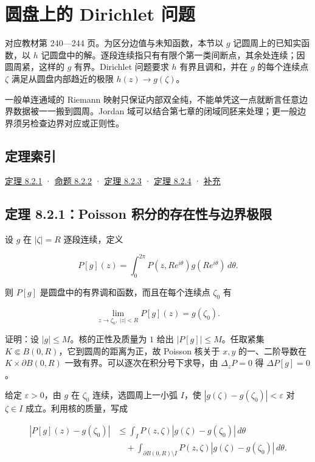 \documentclass[11pt,a4paper]{article}
\begin{document}
\section{圆盘上的 Dirichlet 问题}
对应教材第 240---244 页。为区分边值与未知函数，本节以 \(g\)
记圆周上的已知实函数，以 \(h\)
记圆盘中的解。逐段连续指只有有限个第一类间断点，其余处连续；因圆周紧，这样的
\(g\) 有界。Dirichlet 问题要求 \(h\) 有界且调和，并在 \(g\) 的每个连续点
\(\zeta\) 满足从圆盘内部趋近的极限 \(h(z)\to g(\zeta)\)。

一般单连通域的 Riemann
映射只保证内部双全纯，不能单凭这一点就断言任意边界数据被一一搬到圆周。Jordan
域可以结合第七章的闭域同胚来处理；更一般边界须另检查边界对应或正则性。

\subsection*{定理索引}\label{ch08-s2-heading-1}

\hyperref[ch08-s2-heading-2]{定理 8.2.1} · \hyperref[ch08-s2-heading-3]{命题 8.2.2} ·
\hyperref[ch08-s2-heading-4]{定理 8.2.3} · \hyperref[ch08-s2-heading-5]{定理 8.2.4} ·
\hyperref[ch08-s2-heading-6]{补充}

\subsection{定理 8.2.1：Poisson 积分的存在性与边界极限}\label{ch08-s2-heading-2}

设 \(g\) 在 \(|\zeta|=R\) 逐段连续，定义

\[
P[g](z)=\int_0^{2\pi}P(z,Re^{i\theta})g(Re^{i\theta})\,d\theta.\tag{8.2.1}
\]

则 \(P[g]\) 是圆盘中的有界调和函数，而且在每个连续点 \(\zeta_0\) 有

\[
\lim_{z\to\zeta_0,\ |z|<R}P[g](z)=g(\zeta_0).\tag{8.2.2}
\]

证明：设 \(|g|\le M\)。核的正性及质量为 \(1\) 给出
\(|P[g]|\le M\)。任取紧集 \(K\Subset B(0,R)\)，它到圆周的距离为正，故
Poisson 核关于 \(x,y\) 的一、二阶导数在 \(K\times\partial B(0,R)\)
一致有界。可以逐次在积分号下求导，由 \(\Delta_zP=0\) 得
\(\Delta P[g]=0\)。

给定 \(\varepsilon>0\)，由 \(g\) 在 \(\zeta_0\) 连续，选圆周上一小弧
\(I\)，使 \(|g(\zeta)-g(\zeta_0)|<\varepsilon\) 对 \(\zeta\in I\)
成立。利用核的质量，写成

\[
\begin{aligned}
|P[g](z)-g(\zeta_0)|
&\le\int_I P(z,\zeta)|g(\zeta)-g(\zeta_0)|\,d\theta\\
&\quad+\int_{\partial B(0,R)\setminus I}P(z,\zeta)|g(\zeta)-g(\zeta_0)|\,d\theta.
\end{aligned}\tag{8.2.A}
\]
\end{document}

